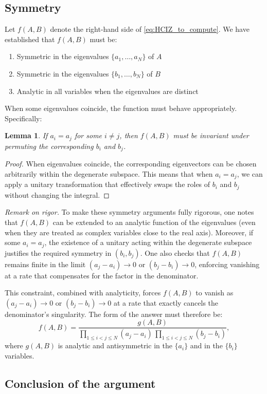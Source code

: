 \documentclass[letterpaper,11pt,oneside,reqno]{article}
\numberwithin{equation}{section}
\newtheorem{lemma}[proposition]{Lemma}
\theoremstyle{definition}
\begin{document}
\subsection{Symmetry}

Let \(f(A,B)\) denote the 
right-hand side of \eqref{eq:HCIZ_to_compute}.
We have established that $f(A,B)$ must be:
\begin{enumerate}
   \item Symmetric in the eigenvalues $\{a_1,\ldots,a_N\}$ of $A$
   \item Symmetric in the eigenvalues $\{b_1,\ldots,b_N\}$ of $B$
   \item Analytic in all variables when the eigenvalues are distinct
\end{enumerate}

When some eigenvalues coincide, the function must behave appropriately. Specifically:
\begin{lemma}
If $a_i = a_j$ for some $i \neq j$, then $f(A,B)$ must be invariant under permuting the corresponding $b_i$ and $b_j$.
\end{lemma}
\begin{proof}
When eigenvalues coincide, the corresponding eigenvectors can be chosen arbitrarily within the degenerate subspace. This means that when $a_i = a_j$, we can apply a unitary transformation that effectively swaps the roles of $b_i$ and $b_j$ without changing the integral.
\end{proof}

\textit{Remark on rigor.} 
To make these symmetry arguments fully rigorous, one notes that $f(A,B)$ can be extended to an analytic function of the eigenvalues (even when they are treated as complex variables close to the real axis). Moreover, if some $a_i = a_j$, the existence of a unitary acting within the degenerate subspace justifies the required symmetry in $(b_i,b_j)$. One also checks that $f(A,B)$ remains finite in the limit $(a_j-a_i)\to 0$ or $(b_j-b_i)\to 0$, enforcing vanishing at a rate that compensates for the factor in the denominator.

This constraint, combined with analyticity, forces $f(A,B)$ to vanish as $(a_j-a_i) \to 0$ or $(b_j-b_i) \to 0$ at a rate that exactly cancels the denominator's singularity. The form of the answer must therefore be:
\[
   f(A,B) = \frac{g(A,B)}{\prod_{1\le i<j\le N}(a_j-a_i)\,\prod_{1\le i<j\le N}(b_j-b_i)},
\]
where $g(A,B)$ is analytic and antisymmetric in the $\{a_i\}$ and in the $\{b_i\}$ variables.

\subsection{Conclusion of the argument}
\end{document}
